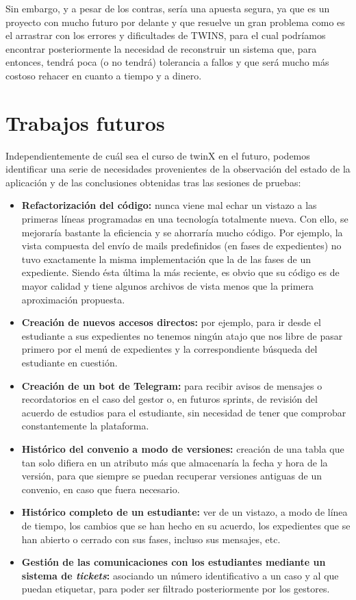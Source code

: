 Sin embargo, y a pesar de los contras, sería una apuesta segura, ya que es un proyecto con mucho futuro por delante y que resuelve un gran problema como es el arrastrar con los errores y dificultades de TWINS, para el cual podríamos encontrar posteriormente la necesidad de reconstruir un sistema que, para entonces, tendrá poca (o no tendrá) tolerancia a fallos y que será mucho más costoso rehacer en cuanto a tiempo y a dinero.

\section{Trabajos futuros}
\label{sec:trabajosfuturos}

Independientemente de cuál sea el curso de twinX en el futuro, podemos identificar una serie de necesidades provenientes de la observación del estado de la aplicación y de las conclusiones obtenidas tras las sesiones de pruebas:

\begin{itemize}
	\item \textbf{Refactorización del código:} nunca viene mal echar un vistazo a las primeras líneas programadas en una tecnología totalmente nueva. Con ello, se mejoraría bastante la eficiencia y se ahorraría mucho código. Por ejemplo, la vista compuesta del envío de mails predefinidos (en fases de expedientes) no tuvo exactamente la misma implementación que la de las fases de un expediente. Siendo ésta última la más reciente, es obvio que su código es de mayor calidad y tiene algunos archivos de vista menos que la primera aproximación propuesta.
	\item \textbf{Creación de nuevos accesos directos:} por ejemplo, para ir desde el estudiante a sus expedientes no tenemos ningún atajo que nos libre de pasar primero por el menú de expedientes y la correspondiente búsqueda del estudiante en cuestión.
	\item \textbf{Creación de un bot de Telegram:} para recibir avisos de mensajes o recordatorios en el caso del gestor o, en futuros sprints, de revisión del acuerdo de estudios para el estudiante, sin necesidad de tener que comprobar constantemente la plataforma.
	\item \textbf{Histórico del convenio a modo de versiones:} creación de una tabla que tan solo difiera en un atributo más que almacenaría la fecha y hora de la versión, para que siempre se puedan recuperar versiones antiguas de un convenio, en caso que fuera necesario.
	\item \textbf{Histórico completo de un estudiante:} ver de un vistazo, a modo de línea de tiempo, los cambios que se han hecho en su acuerdo, los expedientes que se han abierto o cerrado con sus fases, incluso sus mensajes, etc.
	\item \textbf{Gestión de las comunicaciones con los estudiantes mediante un sistema de \textit{tickets}:} asociando un número identificativo a un caso y al que puedan etiquetar, para poder ser filtrado posteriormente por los gestores.
\end{itemize}

